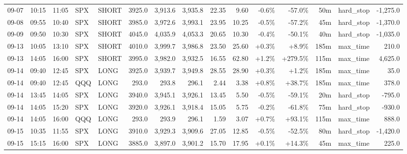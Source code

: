 \documentclass[11pt,a4paper,twoside]{article}
\begin{document}
\begin{landscape}
\begin{center}
\begin{longtable}{>{\color{txtmain}}l l l l l r r r r r r r r >{\color{txtmain}}l r}
09-07 & 10:15 & 11:05 & SPX & SHORT & 3925.0 & 3,913.6 & 3,935.8 & 22.35 & 9.60 & \textcolor{lossred}{-0.6\%} & \textcolor{lossred}{-57.0\%} & 50m & hard\_stop & \textcolor{lossred}{-1,275.0} \\
09-08 & 09:55 & 10:40 & SPX & SHORT & 3985.0 & 3,972.6 & 3,993.1 & 23.95 & 10.25 & \textcolor{lossred}{-0.5\%} & \textcolor{lossred}{-57.2\%} & 45m & hard\_stop & \textcolor{lossred}{-1,370.0} \\
09-09 & 09:50 & 10:30 & SPX & SHORT & 4045.0 & 4,035.9 & 4,053.3 & 20.65 & 10.30 & \textcolor{lossred}{-0.4\%} & \textcolor{lossred}{-50.1\%} & 40m & hard\_stop & \textcolor{lossred}{-1,035.0} \\
09-13 & 10:05 & 13:10 & SPX & SHORT & 4010.0 & 3,999.7 & 3,986.8 & 23.50 & 25.60 & \textcolor{wingreen}{+0.3\%} & \textcolor{wingreen}{+8.9\%} & 185m & max\_time & \textcolor{wingreen}{210.0} \\
09-13 & 14:05 & 16:00 & SPX & SHORT & 3995.0 & 3,982.0 & 3,932.5 & 16.55 & 62.80 & \textcolor{wingreen}{+1.2\%} & \textcolor{wingreen}{+279.5\%} & 115m & max\_time & \textcolor{wingreen}{4,625.0} \\
09-14 & 09:40 & 12:45 & SPX & LONG & 3925.0 & 3,939.7 & 3,949.8 & 28.55 & 28.90 & \textcolor{wingreen}{+0.3\%} & \textcolor{wingreen}{+1.2\%} & 185m & max\_time & \textcolor{wingreen}{35.0} \\
09-14 & 09:40 & 12:45 & QQQ & LONG & 293.0 & 293.8 & 296.1 & 2.44 & 3.38 & \textcolor{wingreen}{+0.8\%} & \textcolor{wingreen}{+38.7\%} & 185m & max\_time & \textcolor{wingreen}{378.0} \\
09-14 & 13:45 & 14:05 & SPX & LONG & 3940.0 & 3,945.1 & 3,926.1 & 13.45 & 5.50 & \textcolor{lossred}{-0.5\%} & \textcolor{lossred}{-59.1\%} & 20m & hard\_stop & \textcolor{lossred}{-795.0} \\
09-14 & 14:05 & 15:20 & SPX & LONG & 3920.0 & 3,926.1 & 3,918.4 & 15.05 & 5.75 & \textcolor{lossred}{-0.2\%} & \textcolor{lossred}{-61.8\%} & 75m & hard\_stop & \textcolor{lossred}{-930.0} \\
09-14 & 14:05 & 16:00 & QQQ & LONG & 293.0 & 293.9 & 296.1 & 1.59 & 3.07 & \textcolor{wingreen}{+0.7\%} & \textcolor{wingreen}{+93.1\%} & 115m & max\_time & \textcolor{wingreen}{888.0} \\
09-15 & 10:35 & 11:55 & SPX & LONG & 3910.0 & 3,929.3 & 3,909.6 & 27.05 & 12.85 & \textcolor{lossred}{-0.5\%} & \textcolor{lossred}{-52.5\%} & 80m & hard\_stop & \textcolor{lossred}{-1,420.0} \\
09-15 & 15:15 & 16:00 & SPX & LONG & 3885.0 & 3,897.0 & 3,901.2 & 15.70 & 17.95 & \textcolor{wingreen}{+0.1\%} & \textcolor{wingreen}{+14.3\%} & 45m & max\_time & \textcolor{wingreen}{225.0} \\

\end{longtable}
\end{center}
\end{landscape}
\end{document}
